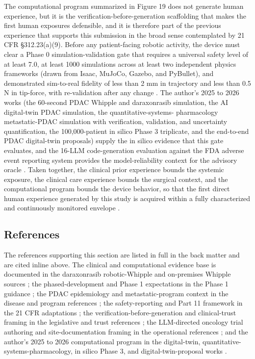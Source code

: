 The computational program summarized in Figure 19 does not generate human
experience, but it is the verification-before-generation scaffolding that makes the
first human exposures defensible, and it is therefore part of the previous
experience that supports this submission in the broad sense contemplated by 21 CFR
\S 312.23(a)(9). Before any patient-facing robotic activity, the device must clear
a Phase 0 simulation-validation gate that requires a universal safety level of at
least 7.0, at least 1000 simulations across at least two independent physics
frameworks (drawn from Isaac, MuJoCo, Gazebo, and PyBullet), and demonstrated
sim-to-real fidelity of less than 2 mm in trajectory and less than 0.5 N in
tip-force, with re-validation after any change \cite{fdadigtwinpc, qspmetpancre}.
The author's 2025 to 2026 works (the 60-second PDAC Whipple and daraxonrasib
simulation, the AI digital-twin PDAC simulation, the quantitative-systems-
pharmacology metastatic-PDAC simulation with verification, validation, and
uncertainty quantification, the 100,000-patient in silico Phase 3 triplicate, and
the end-to-end PDAC digital-twin proposals) supply the in silico evidence that this
gate evaluates, and the 16-LLM code-generation evaluation against the FDA adverse
event reporting system provides the model-reliability context for the advisory
oracle \cite{chatgpt100kp, pdacdigtwinp, llmcomp16fda}. Taken together, the clinical
prior experience bounds the systemic exposure, the clinical care experience bounds
the surgical context, and the computational program bounds the device behavior, so
that the first direct human experience generated by this study is acquired within a
fully characterized and continuously monitored envelope \cite{daraxwhipple,
onpremwhippl, clintrustpai}.

\subsection{References}

The references supporting this section are listed in full in the back matter and
are cited inline above. The clinical and computational evidence base is documented
in the daraxonrasib robotic-Whipple and on-premises Whipple sources
\cite{daraxwhipple, onpremwhippl}; the phased-development and Phase 1 expectations
in the Phase 1 guidance \cite{phase1guidance}; the PDAC epidemiology and
metastatic-program context in the disease and program references
\cite{pdac060s2030}; the safety-reporting and Part 11 framework in the 21 CFR
adaptations \cite{cfr312paiuni, cfr050paiuni, ichpaistduni}; the
verification-before-generation and clinical-trust framing in the legislative and
trust references \cite{congress9510, clintrustpai}; the LLM-directed oncology trial
authoring and site-documentation framing in the operational references
\cite{oncotrialllm, paisitedocpk, paipredict4x, paiautospons, natlpaiplatf}; and the
author's 2025 to 2026 computational program in the digital-twin,
quantitative-systems-pharmacology, in silico Phase 3, and digital-twin-proposal
works \cite{fdadigtwinpc, qspmetpancre, chatgpt100kp, pdacdigtwinp, llmcomp16fda}.
